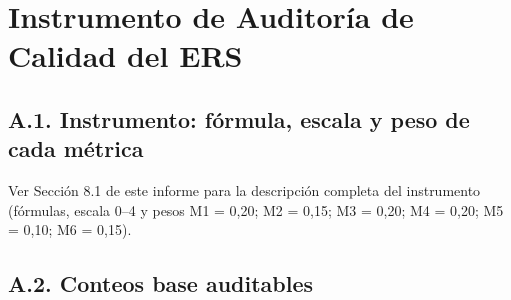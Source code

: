 \documentclass[11pt]{article}
\begin{document}
	\newpage
	
	\appendix
	\section{Instrumento de Auditoría de Calidad del ERS}
	\label{app:auditoria}
	
	\subsection*{A.1. Instrumento: fórmula, escala y peso de cada métrica}
	
	Ver Sección 8.1 de este informe para la descripción completa del instrumento (fórmulas, escala 0--4 y pesos M1 = 0,20; M2 = 0,15; M3 = 0,20; M4 = 0,20; M5 = 0,10; M6 = 0,15).
	
	\subsection*{A.2. Conteos base auditables}
	
\end{document}
